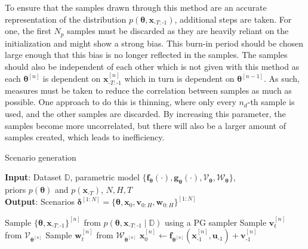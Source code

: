 To ensure that the samples drawn through this method are an accurate representation of the distribution  $p(\boldsymbol{\theta}, \boldsymbol{x}_{\text{-}T:\text{-}1})$, additional steps are taken. For one, the first $N_p$ samples must be discarded as they are heavily reliant on the initialization and might show a strong bias. This burn-in period should be chosen large enough that this bias is no longer reflected in the samples. The samples should also be independent of each other which is not given with this method as each $\boldsymbol{\theta}^{[n]}$ is dependent on $\boldsymbol{x}_{\text{-}T:\text{-}1}^{[n]}$ which in turn is dependent on $\boldsymbol{\theta}^{[n-1]}$. As such, measures must be taken to reduce the correlation between samples as much as possible. One approach to do this is thinning, where only every $n_d$-th sample is used, and the other samples are discarded. By increasing this parameter, the samples become more uncorrelated, but there will also be a larger amount of samples created, which leads to inefficiency.

\begin{algorithm}[t]
	\caption{Scenario generation}\label{alg:PGibbs}
	\hspace*{\algorithmicindent} \textbf{Input}: Dataset $\mathbb{D}$, parametric model $\{\boldsymbol{f}_{\boldsymbol{\theta}}(\cdot), \boldsymbol{g}_{\boldsymbol{\theta}}(\cdot), \boldsymbol{\mathcal{V}}_{\boldsymbol{\theta}}, \boldsymbol{\mathcal{W}}_{\boldsymbol{\theta}}\}$, \\
	\hspace*{\algorithmicindent} \hspace*{\algorithmicindent} priors $p(\boldsymbol{\theta})$ and $p(\boldsymbol{x}_{\text{-}T})$, $N, H, T$ \\
	\hspace*{\algorithmicindent} \textbf{Output}: Scenarios $ \boldsymbol{\delta}^{[1:N]} = \{ \boldsymbol{\theta}, \boldsymbol{x}_0, \boldsymbol{v}_{0:H}, \boldsymbol{w}_{0:H}\}^{[1:N]}$
	\begin{algorithmic}[1]
			\State Sample $\{ \boldsymbol{\theta}, \boldsymbol{x}_{\text{-}T:\text{-}1} \}^{[n]}$ from $p\left( \boldsymbol{\theta}, \boldsymbol{x}_{\text{-}T:\text{-}1} \mid \mathbb{D} \right)$ using a PG sampler
				\State Sample $\boldsymbol{v}_t^{[n]}$ from $\boldsymbol{\mathcal{V}}_{\boldsymbol{\theta}^{[n]}}$
				\State Sample $\boldsymbol{w}_t^{[n]}$ from $\boldsymbol{\mathcal{W}}_{\boldsymbol{\theta}^{[n]}}$
			\EndFor
			\State $\boldsymbol{x}_0^{[n]} \gets \boldsymbol{f}_{\boldsymbol{\theta}^{[n]}} \left( \boldsymbol{x}_{\text{-} 1}^{[n]}, \boldsymbol{u}_{\text{-} 1} \right) + \boldsymbol{v}_{\text{-} 1}^{[n]}$
		\EndFor
	\end{algorithmic}
\end{algorithm}

